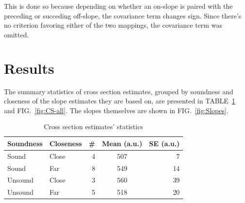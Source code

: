 \documentclass[reprint]{revtex4-1}
\begin{document}
This is done so because depending on whether an on-slope is paired with the preceding or succeding off-slope, the covariance term changes sign. Since there's no criterion favoring either of the two mappings, the covariance term was omitted.


\section{Results}

The summary statistics of cross section estimates, grouped by soundness and closeness of the slope estimates they are based on, are presented in TABLE~\ref{tbl:CS-all} and FIG.~\ref{fig:CS-all}. The slopes themselves are shown in FIG.~\ref{fig:Slopes}.

\begin{table}
\centering
\caption{Cross section estimates' statistics\label{tbl:CS-all}}
\begin{tabular}{llrcr}
\hline\hline
Soundness	& Closeness		& \#		& Mean (a.u.)		& SE (a.u.) \\
\hline
Sound		& Close			& 4			& 507				& 7  \\
Sound		& Far			& 8			& 549				& 14 \\
Unsound		& Close			& 3			& 560				& 39 \\
Unsound		& Far			& 5			& 518				& 20 \\
\end{tabular}
\end{table}
\end{document}
